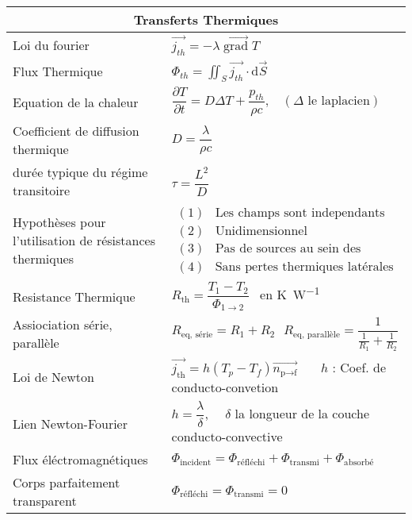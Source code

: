 \documentclass[10pt,a4paper,titlepage,landscape]{article}
\renewcommand{\d}
{
    \mathrm{d}
}
\newcommand*{\dpv}[2]
{
    \dfrac{\partial#1}{\partial#2}
}
\newcommand{\grad}
{
    \vec{\operatorname{grad}}
}
\renewcommand{\arraystretch}{2}
\begin{document}
\begin{table}[H]
    \centering
    \renewcommand{\arraystretch}{1.5} %
    \setlength{\tabcolsep}{8pt} %
    \begin{tabular}{@{}|p{9cm}|p{10cm}@{}|}
        \multicolumn{2}{c}{\textbf{Transferts Thermiques}} \\ \hline
        Loi du fourier & $\vec{j_{th}} = -\lambda \grad{T}$ \\ \hline
        Flux Thermique & $\displaystyle \Phi_{th} = \iint_{S} \vec{j_{th}}  \cdot \d \vec{S}$ \\ \hline
        Equation de la chaleur & $\dpv{T}{t} = D\Delta T + \dfrac{p_{th}}{\rho c}, \ \ \ \ (\Delta \text{ le laplacien})$ \\ \hline
        Coefficient de diffusion thermique & $D = \dfrac{\lambda}{\rho c}$ \\ \hline
        durée typique du régime transitoire & $\tau = \dfrac{L^2}{D}$ \\ \hline
        Hypothèses pour l'utilisation de résistances thermiques & $\begin{matrix} (1) & \text{Les champs sont independants du temps} \\ (2) & \text{Unidimensionnel} \\ (3) & \text{Pas de sources au sein des materiaux} \\ (4) & \text{Sans pertes thermiques latérales} \end{matrix}$ \\ \hline
        Resistance Thermique & $R_\text{th} = \dfrac{T_1 - T_2}{\Phi_{1\to 2}}$ \ en \unit{\K\per\W} \\ \hline
        Assiociation série, parallèle & $R_{\text{eq, série}} = R_1 + R_2 \ \ \ R_{\text{eq, parallèle}} = \dfrac{1}{\frac{1}{R_1} + \frac{1}{R_2}}$ \\ \hline
        Loi de Newton & $\vec{j_{\text{th}}} = h \left(T_p - T_f\right) \vec{n_{\text{p} \to \text{f}}}$ \ \ \ $h$ : Coef. de conducto-convetion \\ \hline
        Lien Newton-Fourier & $h = \dfrac{\lambda}{\delta}$, \ \ $\delta$ la longueur de la couche conducto-convective \\ \hline
        Flux éléctromagnétiques & $\Phi_{\text{incident}} = \Phi_{\text{réfléchi}} + \Phi_{\text{transmi}} + \Phi_{\text{absorbé}}$ \\ \hline
        Corps parfaitement transparent & $\Phi_{\text{réfléchi}} = \Phi_{\text{transmi}} = 0$ \\ \hline

\end{tabular}
\end{table}
\end{document}
